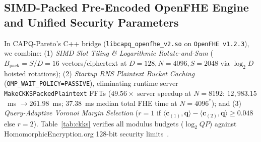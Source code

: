 \documentclass[10pt,journal,compsoc]{IEEEtran}
\begin{document}
\subsection{SIMD-Packed Pre-Encoded OpenFHE Engine and Unified Security Parameters}
In CAPQ-Pareto's C++ bridge (\texttt{libcapq\_openfhe\_v2.so} on \texttt{OpenFHE v1.2.3}), we combine: (1) \emph{SIMD Slot Tiling \& Logarithmic Rotate-and-Sum} ($B_{\mathrm{pack}}=S/D=16$ vectors/ciphertext at $D=128, N=4096, S=2048$ via $\log_2 D$ hoisted rotations); (2) \emph{Startup RNS Plaintext Bucket Caching} (\texttt{OMP\_WAIT\_POLICY=PASSIVE}), eliminating runtime server \texttt{MakeCKKSPackedPlaintext} FFTs ($49.56\times$ server speedup at $N=8192$: $12,983.15$~ms $\to 261.98$~ms; $37.38$~ms median total FHE time at $N=4096^*$); and (3) \emph{Query-Adaptive Voronoi Margin Selection} ($r=1$ if $\langle \mathbf{c}_{(1)},\mathbf{q}\rangle - \langle \mathbf{c}_{(2)},\mathbf{q}\rangle \ge 0.048$ else $r=2$). Table~\ref{tab:ckks} verifies all modulus budgets ($\log_2 QP$) against HomomorphicEncryption.org 128-bit security limits~\cite{albrecht2021hestandard}.
\end{document}
